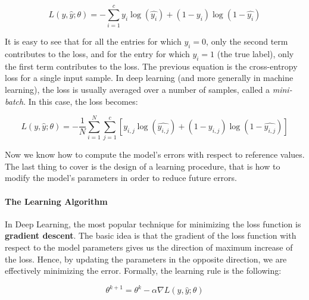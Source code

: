 \documentclass[../main.tex]{subfiles}
\begin{document}
    \begin{equation}
        L(y, \hat{y}; \theta) = - \sum_{i = 1}^{c} y_{i} \log(\hat{y_{i}}) + (1 - y_{i})\log(1 - \hat{y_{i}})
    \end{equation}

    It is easy to see that for all the entries for which $y_{i} = 0$, only the second term contributes to the loss, and for the entry
    for which $y_{i} = 1$ (the true label), only the first term contributes to the loss. The previous equation is the cross-entropy loss for a single
    input sample. In deep learning (and more generally in machine learning), the loss is usually averaged over a number of samples,
    called a \textit{mini-batch}. In this case, the loss becomes:

    \begin{equation}
        L(y, \hat{y}; \theta) = - \frac{1}{N} \sum_{i = 1}^{N} \sum_{j = 1}^{c} \left[ y_{i, j} \log(\hat{y_{i, j}}) + (1 - y_{i, j})\log(1 - \hat{y_{i, j}})  \right]
    \end{equation}

    Now we know how to compute the model's errors with respect to reference values. The last thing to cover is the design of a learning
    procedure, that is how to modify the model's parameters in order to reduce future errors.

    \paragraph{The Learning Algorithm}
    In Deep Learning, the most popular technique for minimizing the loss function is \textbf{gradient descent}. The basic idea
    is that the gradient of the loss function with respect to the model parameters gives us the direction of maximum increase
    of the loss. Hence, by updating the parameters in the opposite direction, we are effectively minimizing the error.
    Formally, the learning rule is the following:

    \begin{equation}
        \theta^{k+1} = \theta^{k} - \alpha \nabla L(y, \hat{y}; \theta)
    \end{equation}
\end{document}
